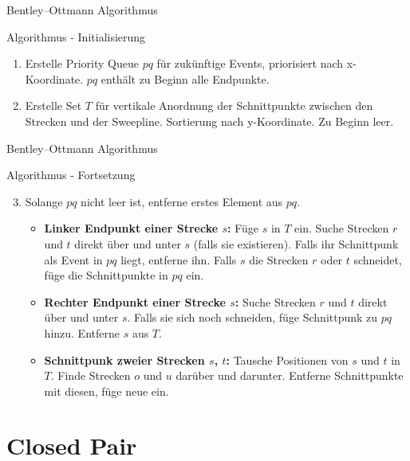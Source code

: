 \documentclass[18pt]{beamer}
\begin{document}
\begin{frame}{Bentley–Ottmann Algorithmus}
	\begin{block}{Algorithmus - Initialisierung}
		\begin{enumerate}
			\item Erstelle Priority Queue $pq$ für zukünftige Events, priorisiert nach x-Koordinate. $pq$ enthält zu Beginn alle Endpunkte.
			\item Erstelle Set $T$ für vertikale Anordnung der Schnittpunkte zwischen den Strecken und der Sweepline. Sortierung nach y-Koordinate. Zu Beginn leer.
		\end{enumerate}
	\end{block}
\end{frame}

\begin{frame}{Bentley–Ottmann Algorithmus}
	\begin{block}{Algorithmus - Fortsetzung}
		\begin{enumerate}
			\setcounter{enumi}{2}
			\item Solange $pq$ nicht leer ist, entferne erstes Element aus $pq$.
			\begin{itemize}
				\item \textbf{Linker Endpunkt einer Strecke $s$:} Füge $s$ in $T$ ein. Suche Strecken $r$ und $t$ direkt über und unter $s$ (falls sie existieren). Falls ihr Schnittpunk als Event in $pq$ liegt, entferne ihn. Falls $s$ die Strecken $r$ oder $t$ schneidet, füge die Schnittpunkte in $pq$ ein.
				
				\item \textbf{Rechter Endpunkt einer Strecke $s$:} Suche Strecken $r$ und $t$ direkt über und unter $s$. Falls sie sich noch schneiden, füge Schnittpunk zu $pq$ hinzu. Entferne $s$ aus $T$. 
				
				\item \textbf{Schnittpunk zweier Strecken $s$, $t$:} Tausche Positionen von $s$ und $t$ in $T$. Finde Strecken $o$ und $u$ darüber und darunter. Entferne Schnittpunkte mit diesen, füge neue ein.
			\end{itemize}
		\end{enumerate}
	\end{block}
\end{frame}

	
\section{Closed Pair}
\end{document}
